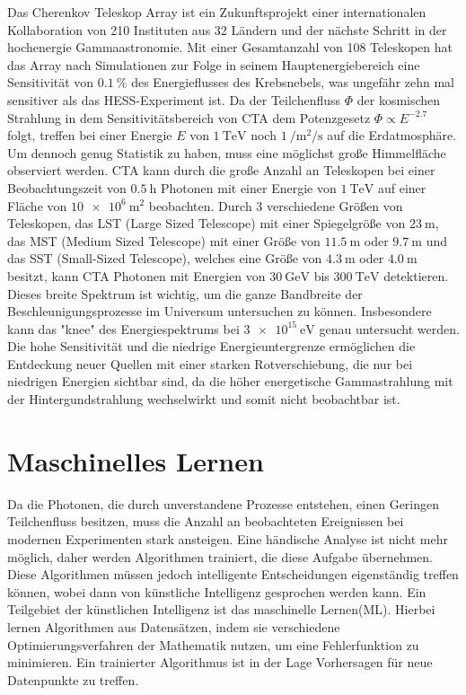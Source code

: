 Das Cherenkov Teleskop Array ist ein Zukunftsprojekt einer internationalen Kollaboration von 210 Instituten aus 32 Ländern\cite{CTA_consortium}
und der nächste Schritt in der hochenergie Gammaastronomie.
Mit einer Gesamtanzahl von 108 Teleskopen hat das Array nach Simulationen zur Folge in seinem Hauptenergiebereich eine Sensitivität von $\SI{0.1}{\percent}$
des Energieflusses des Krebsnebels, was ungefähr zehn mal sensitiver als das HESS-Experiment ist\cite{CTA_paper}.
Da der Teilchenfluss $\Phi$ der kosmischen Strahlung in dem Sensitivitätsbereich von CTA dem Potenzgesetz $\Phi \propto E^{-2.7}$\cite[5]{Cosmic_rays} folgt,
treffen bei einer Energie $E$ von $\SI{1}{\tera\eV}$ noch $\SI{1}{\per\m\squared\per\s}$ auf die Erdatmosphäre.
Um dennoch genug Statistik zu haben, muss eine möglichst große Himmelfläche observiert werden.
CTA kann durch die große Anzahl an Teleskopen bei einer Beobachtungszeit von $\SI{0.5}{\hour}$ Photonen mit einer Energie von $\SI{1}{\tera\eV}$ auf einer
Fläche von $\SI{10e6}{\m\squared}$\cite{CTA_ob} beobachten.
Durch 3 verschiedene Größen von Teleskopen, das LST (Large Sized Telescope) mit einer Spiegelgröße von $\SI{23}{\m}$, das MST (Medium Sized Telescope)
mit einer Größe von $\SI{11.5}{\m}$ oder $\SI{9.7}{\m}$ und das SST (Small-Sized Telescope), welches eine Größe von $\SI{4.3}{\m}$ oder $\SI{4.0}{\m}$
besitzt, kann CTA Photonen mit Energien von $\SI{30}{\giga\eV}$ bis $\SI{300}{\tera\eV}$ detektieren.
Dieses breite Spektrum ist wichtig, um die ganze Bandbreite der Beschleunigungsprozesse im Universum untersuchen zu können.
Insbesondere kann das "knee" des Energiespektrums bei $\SI{3e15}{\eV}$ genau untersucht werden.
Die hohe Sensitivität und die niedrige Energieuntergrenze ermöglichen die Entdeckung neuer Quellen mit einer starken Rotverschiebung, die nur bei niedrigen
Energien sichtbar sind, da die höher energetische Gammastrahlung mit der Hintergundstrahlung wechselwirkt und somit nicht beobachtbar ist.

\section{Maschinelles Lernen}
\label{sec:ML}

Da die Photonen, die durch unverstandene Prozesse entstehen, einen Geringen Teilchenfluss besitzen, muss die Anzahl an beobachteten Ereignissen bei modernen
Experimenten stark ansteigen.
Eine händische Analyse ist nicht mehr möglich, daher werden Algorithmen trainiert,
die diese Aufgabe übernehmen. Diese Algorithmen müssen jedoch intelligente Entscheidungen eigenständig treffen können, wobei dann von künstliche Intelligenz
gesprochen werden kann.
Ein Teilgebiet der künstlichen Intelligenz ist das maschinelle Lernen(ML). Hierbei lernen Algorithmen aus Datensätzen, indem sie verschiedene Optimierungsverfahren
der Mathematik nutzen, um eine Fehlerfunktion zu minimieren. Ein trainierter Algorithmus ist in der Lage Vorhersagen für neue Datenpunkte zu treffen.

